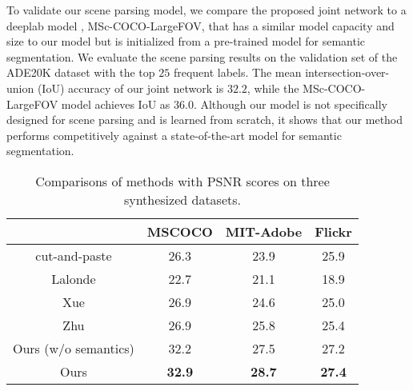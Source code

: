 \documentclass[10pt,twocolumn,letterpaper]{article}
\begin{document}
To validate our scene parsing model, we compare the proposed joint network to a deeplab model \cite{Chen_ICLR_2015}, MSc-COCO-LargeFOV, that has a similar model capacity and size to our model but is initialized from a pre-trained model for semantic segmentation.
%
We evaluate the scene parsing results on the validation set of the ADE20K dataset with the top $25$ frequent labels. 
%
The mean intersection-over-union (IoU) accuracy of our joint network is $32.2$, while the MSc-COCO-LargeFOV model achieves IoU as $36.0$.
%
Although our model is not specifically designed for scene parsing and is learned from scratch, it shows that our method performs competitively against a state-of-the-art model for semantic segmentation.
%
%
\begin{table}[t]
	\caption{Comparisons of methods with PSNR scores on three synthesized datasets.
	}
	\vspace{1mm}
	\small
	\centering
	\renewcommand{\arraystretch}{1.5}
	\setlength{\tabcolsep}{6pt}     
	\begin{tabular}{|c|c|c|c|}
		\hline
		& MSCOCO & MIT-Adobe & Flickr \\
		\hline
		\vspace{-2mm}
		
		cut-and-paste & 26.3 & 23.9 & 25.9 \\
		\vspace{-2mm}
		
		Lalonde \cite{Lalonde_ICCV_2007} & 22.7 & 21.1 & 18.9 \\
		\vspace{-2mm}
		
		Xue \cite{Xue_siggraph_2012} & 26.9 & 24.6 & 25.0 \\
		\vspace{-2mm}
		
		Zhu \cite{Zhu_ICCV_2015} & 26.9 & 25.8 & 25.4 \\
		\vspace{-2mm}
		
		Ours (w/o semantics) & 32.2 & 27.5 & 27.2 \\
		
		Ours & \textbf{32.9} & \textbf{28.7} & \textbf{27.4} \\
		
		\hline
	\end{tabular}
	\label{tab:psnr}
\end{table}
%
%
\end{document}
